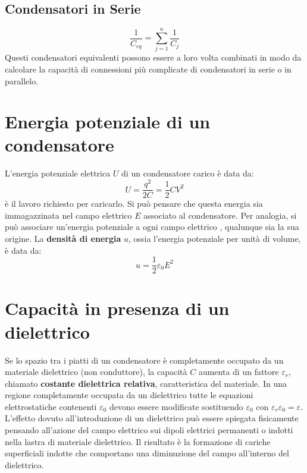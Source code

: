         \subsection{Condensatori in Serie}
            \begin{equation}
                \frac{1}{C_{eq}} = \sum_{j = 1}^{n} \frac{1}{C_j}
            \end{equation}
    Questi condensatori equivalenti possono essere a loro volta combinati in 
    modo da calcolare la capacità di connessioni più complicate di condensatori
    in serie o in parallelo.

    \section{Energia potenziale di un condensatore} L'energia potenziale 
    elettrica $U$ di un condensatore carico è data da:
        \begin{equation}
            U = \frac{q^2}{2C} = \frac{1}{2}CV^2
        \end{equation}
    è il lavoro richiesto per caricarlo. Si può pensare che questa energia sia 
    immagazzinata nel campo elettrico $E$ associato al condensatore. 
    Per analogia, si può associare un'energia potenziale a ogni campo elettrico
    , qualunque sia la sua origine. La \textbf{densità di energia} $u$, ossia
    l'energia potenziale per unità di volume, è data da:
        \begin{equation}
            u = \frac{1}{2}\varepsilon_0E^2
        \end{equation}
    
    \section{Capacità in presenza di un dielettrico} Se lo spazio tra i piatti
    di un condensatore è completamente occupato da un materiale dielettrico
    (non conduttore), la capacità $C$ aumenta di un fattore $\varepsilon_r$,
    chiamato \textbf{costante dielettrica relativa}, caratteristica del 
    materiale. In una regione completamente occupata da un dielettrico tutte le
    equazioni elettrostatiche contenenti $\varepsilon_0$ devono essere 
    modificate sostituendo $\varepsilon_0$ con $\varepsilon_r\varepsilon_0 =
    \varepsilon$.\\
    L'effetto dovuto all'introduzione di un dielettrico può essere spiegata
    fisicamente pensando all'azione del campo elettrico sui dipoli elettrici 
    permanenti o indotti nella lastra di materiale dielettrico. Il risultato è
    la formazione di cariche superficiali indotte che comportano una 
    diminuzione del campo all'interno del dielettrico.
        

